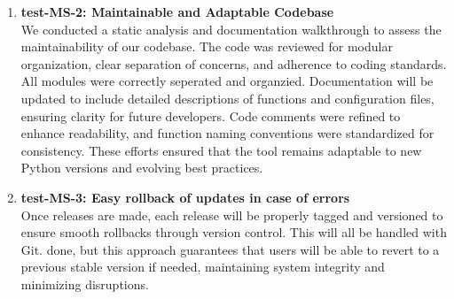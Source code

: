 \documentclass[12pt, titlepage]{article}
\begin{document}
\begin{enumerate}
  \item \textbf{test-MS-2: Maintainable and Adaptable Codebase} \\[2mm]
    We conducted a static analysis and documentation walkthrough to
    assess the maintainability of our codebase. The code was reviewed
    for modular organization, clear separation
    of concerns, and adherence to coding standards. All modules were
    correctly seperated and organzied. Documentation will be updated
    to include detailed descriptions of functions
    and configuration files, ensuring clarity for future developers.
    Code comments were refined to enhance readability, and function
    naming conventions were standardized for
    consistency. These efforts ensured that the tool remains
    adaptable to new Python versions and evolving best practices.

  \item \textbf{test-MS-3: Easy rollback of updates in case of errors} \\[2mm]
    Once releases are made, each release will be properly tagged and
    versioned to ensure smooth rollbacks through version control.
    This will all be handled with Git. done, but
    this approach guarantees that users will be able to revert to a
    previous stable version if needed, maintaining system integrity
    and minimizing disruptions.
\end{enumerate}
\end{document}
